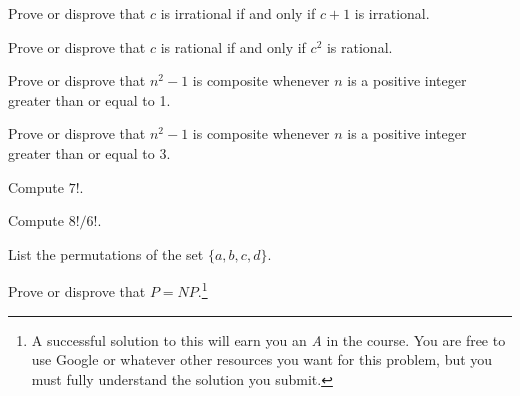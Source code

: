 \begin{pro}
Prove or disprove that $c$ is irrational if and only if $c+1$ is irrational. 
\end{pro}

\begin{pro}
Prove or disprove that $c$ is rational if and only if $c^2$ is rational. 
\end{pro}

\begin{pro}
Prove or disprove that $n^2-1$ is composite whenever $n$ is a positive
integer greater than or equal to 1.
\end{pro}

\begin{pro}
Prove or disprove that $n^2-1$ is composite whenever $n$ is a positive
integer greater than or equal to 3. 
\end{pro}

\begin{pro}
Compute $7!$.
\end{pro}

\begin{pro}
Compute $8!/6!$.
\end{pro}

\begin{pro}
List the permutations of the set $\{a,b,c,d\}$.
\end{pro}


\begin{pro}
Prove or disprove that $P=NP$.\footnote{A successful solution to this will earn you an {\em A} in the course.
You are free to use Google or whatever other resources you want for this problem, but you must fully understand
the solution you submit.}
\end{pro}